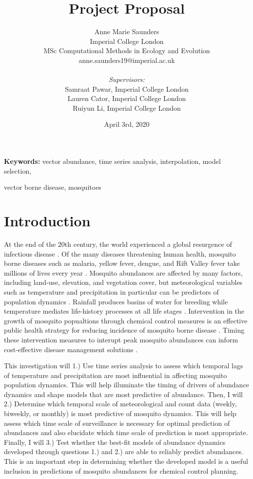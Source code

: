 \documentclass[11pt, a4paper]{article}
\title{Project Proposal}
\author{Anne Marie Saunders\\
	Imperial College London\\
	MSc Computational Methods in Ecology and Evolution\\
	anne.saunders19@imperial.ac.uk\\\\
	\textit{Supervisors:}\\
	Samraat Pawar, Imperial College London\\
	Lauren Cator, Imperial College London\\
	Ruiyun Li, Imperial College London\\}
\date{April 3rd, 2020}
\begin{document}
\begin{titlepage}
	\maketitle
\end{titlepage}

\textbf{Keywords:} vector abundance, time series analysis, interpolation, model selection, 

\hspace{2.1cm}vector borne disease, mosquitoes

\section{Introduction}

At the end of the 20th century, the world experienced a global resurgence of infectious disease \citep{Gubler}. Of the many diseases threatening human health, mosquito borne diseases such as malaria, yellow fever, dengue, and Rift Valley fever take millions of lives every year \citep{Yang2009}. Mosquito abundances are affected by many factors, including land-use, elevation, and vegetation cover, but meteorological variables such as temperature and precipitation in particular can be predictors of population dynamics \citep{Yoo2016}. Rainfall produces basins of water for breeding while temperature mediates life-history processes at all life stages \citep{Yang2009, Beck-Johnson2013}. Intervention in the growth of mosquito popualtions through chemical control measures is an effective public health strategy for reducing incidence of mosquito borne disease \citep{Tomerini2011}. Timing these intervention measures to interupt peak mosquito abundances can inform cost-effective disease management solutions \citep{Yang2009}. 

This investigation will 1.) Use time series analysis to assess which temporal lags of temperature and precipitation are most influential in affecting mosquito population dynamics. This will help illuminate the timing of drivers of abundance dynamics and shape models that are most predictive of abundance. Then, I will 2.) Determine which temporal scale of meteorological and count data (weekly, biweekly, or monthly) is most predictive of mosquito dynamics. This will help assess which time scale of surveillance is necessary for optimal prediction of abundances and also elucidate which time scale of prediction is most appropriate. Finally, I will 3.) Test whether the best-fit models of abundance dynamics developed through questions 1.) and 2.) are able to reliably predict abundances. This is an important step in determining whether the developed model is a useful inclusion in predictions of mosquito abundances for chemical control planning. 
\end{document}
